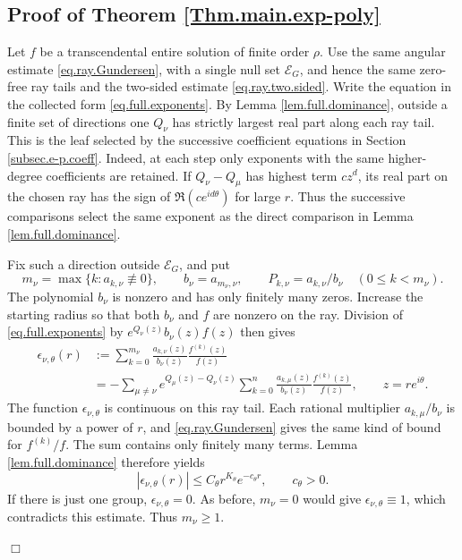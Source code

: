 \documentclass[a4paper,12pt]{article}
\newenvironment{proof}
{\noindent{\it Proof.}}{\hfill $\Box$\par\vspace{2.5mm}}
\numberwithin{equation}{section}
\begin{document}
\subsection{Proof of Theorem \ref{Thm.main.exp-poly}}
\begin{proof}
Let $f$ be a transcendental entire solution of finite order $\rho$.
Use the same angular estimate \eqref{eq.ray.Gundersen}, with a single
null set $\mathcal E_G$, and hence the same zero-free ray tails and
the two-sided estimate \eqref{eq.ray.two.sided}.
Write the equation in the collected form \eqref{eq.full.exponents}.
By Lemma \ref{lem.full.dominance}, outside a finite set of directions
one $Q_\nu$ has strictly largest real part along each ray tail.
This is the leaf selected by the successive coefficient equations
in Section \ref{subsec.e-p.coeff}.
Indeed, at each step only exponents with the same higher-degree
coefficients are retained. If $Q_\nu-Q_\mu$ has highest term $c z^d$,
its real part on the chosen ray has the sign of $\Re(c e^{id\theta})$
for large $r$. Thus the successive comparisons select the same
exponent as the direct comparison in Lemma \ref{lem.full.dominance}.

Fix such a direction outside $\mathcal E_G$, and put
\[
 m_\nu=\max\{k:a_{k,\nu}\not\equiv0\},\qquad
 b_\nu=a_{m_\nu,\nu},\qquad
 P_{k,\nu}=a_{k,\nu}/b_\nu\quad(0\le k<m_\nu).
\]
The polynomial $b_\nu$ is nonzero and has only finitely many zeros.
Increase the starting radius so that both $b_\nu$ and $f$ are nonzero
on the ray. Division of \eqref{eq.full.exponents} by
$e^{Q_\nu(z)}b_\nu(z)f(z)$ then gives
\begin{equation}\label{eq.exppoly.residual}
 \begin{split}
 \epsilon_{\nu,\theta}(r)
 &:=\sum_{k=0}^{m_\nu}\frac{a_{k,\nu}(z)}{b_\nu(z)}
                         \frac{f^{(k)}(z)}{f(z)}\\
 &=-\sum_{\mu\ne\nu}e^{Q_\mu(z)-Q_\nu(z)}
       \sum_{k=0}^{n}\frac{a_{k,\mu}(z)}{b_\nu(z)}
                            \frac{f^{(k)}(z)}{f(z)},
 \qquad z=re^{i\theta}.
 \end{split}
\end{equation}
The function $\epsilon_{\nu,\theta}$ is continuous on this ray tail.
Each rational multiplier $a_{k,\mu}/b_\nu$ is bounded by a power of $r$,
and \eqref{eq.ray.Gundersen} gives the same kind of bound for
$f^{(k)}/f$. The sum contains only finitely many terms.
Lemma \ref{lem.full.dominance} therefore yields
\begin{equation}\label{eq.exppoly.small}
 |\epsilon_{\nu,\theta}(r)|\le C_\theta r^{K_\theta}e^{-c_\theta r},
 \qquad c_\theta>0.
\end{equation}
If there is just one group, $\epsilon_{\nu,\theta}=0$.
As before, $m_\nu=0$ would give $\epsilon_{\nu,\theta}\equiv1$,
which contradicts this estimate. Thus $m_\nu\ge1$.


\end{proof}
\end{document}
